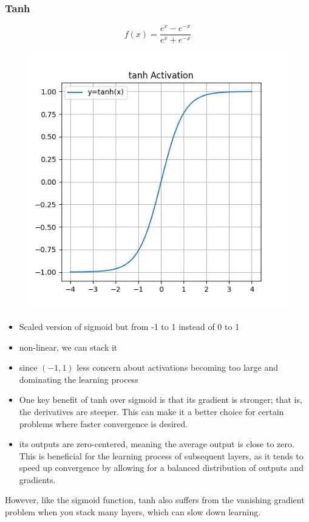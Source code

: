 \documentclass[11pt]{article}
\begin{document}
\subsubsection{Tanh}

\begin{definition}\label{eq:activation-tanh}
    \begin{equation*}
        f(x) = \frac{e^x-e^{-x}}{e^x+e^{-x}}
    \end{equation*}
\end{definition}

\begin{figure}[H]
    \centering
    \includegraphics*[width=.4\linewidth]{figures/tanh Activation.png}\label{fig:tanh}
\end{figure}

\begin{itemize}
    \item Scaled version of sigmoid but from -1 to 1 instead of 0 to 1
    \item non-linear, we can stack it 
    \item since $(-1,1)$ less concern about activations becoming too large and dominating the learning process
    \item One key benefit of tanh over sigmoid is that its gradient is stronger; that is, the derivatives are steeper. This can make it a better choice for certain problems where faster convergence is desired.
    \item its outputs are zero-centered, meaning the average output is close to zero. This is beneficial for the learning process of subsequent layers, as it tends to speed up convergence by allowing for a balanced distribution of outputs and gradients.
\end{itemize}

However, like the sigmoid function, tanh also suffers from the vanishing gradient problem when you stack many layers, which can slow down learning.
\end{document}
